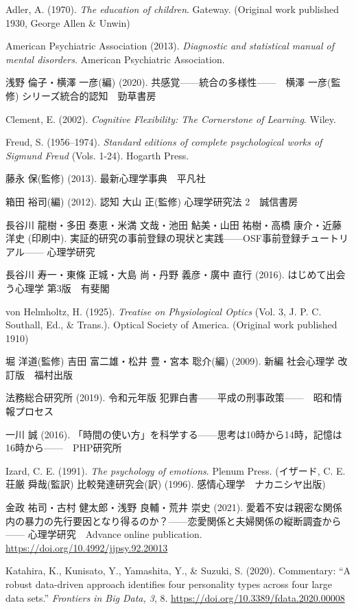 Adler, A. (1970). \textit{The education of children}. Gateway. (Original work published 1930, George Allen \& Unwin)

American Psychiatric Association (2013). \textit{Diagnostic and statistical manual of mental disorders}. American Psychiatric Association.

浅野 倫子・横澤 一彦(編) (2020). 共感覚------統合の多様性------　横澤 一彦(監修) シリーズ統合的認知　勁草書房

Clement, E. (2002). \textit{Cognitive Flexibility: The Cornerstone of Learning}. Wiley.

Freud, S. (1956--1974). \textit{Standard editions of complete psychological works of Sigmund Freud} (Vols. 1-24). Hogarth Press.

藤永 保(監修) (2013). 最新心理学事典　平凡社

箱田 裕司(編) (2012). 認知 大山 正(監修) 心理学研究法 2　誠信書房

長谷川 龍樹・多田 奏恵・米満 文哉・池田 鮎美・山田 祐樹・高橋 康介・近藤 洋史 (印刷中). 実証的研究の事前登録の現状と実践------OSF事前登録チュートリアル------ 心理学研究

長谷川 寿一・東條 正城・大島 尚・丹野 義彦・廣中 直行 (2016). はじめて出会う心理学 第3版　有斐閣

von Helmholtz, H. (1925). \textit{Treatise on Physiological Optics} (Vol. 3, J. P. C. Southall, Ed., \& Trans.). Optical Society of America. (Original work published 1910)

堀 洋道(監修) 吉田 富二雄・松井 豊・宮本 聡介(編) (2009). 新編 社会心理学 改訂版　福村出版

法務総合研究所 (2019). 令和元年版 犯罪白書------平成の刑事政策------　昭和情報プロセス

一川 誠 (2016). 「時間の使い方」を科学する------思考は10時から14時，記憶は16時から------　PHP研究所

Izard, C. E.  (1991). \textit{The psychology of emotions}. Plenum Press.
(イザード, C. E. 荘厳 舜哉(監訳) 比較発達研究会(訳) (1996). 感情心理学　ナカニシヤ出版)

金政 祐司・古村 健太郎・浅野 良輔・荒井 崇史 (2021). 愛着不安は親密な関係内の暴力の先行要因となり得るのか？------恋愛関係と夫婦関係の縦断調査から------ 心理学研究　Advance online publication. \url{https://doi.org/10.4992/jjpsy.92.20013}

Katahira, K., Kunisato, Y., Yamashita, Y., \& Suzuki, S. (2020). Commentary: ``A robust data-driven approach identifies four personality types across four large data sets.'' \textit{Frontiers in Big Data, 3}, 8. \url{https://doi.org/10.3389/fdata.2020.00008}

